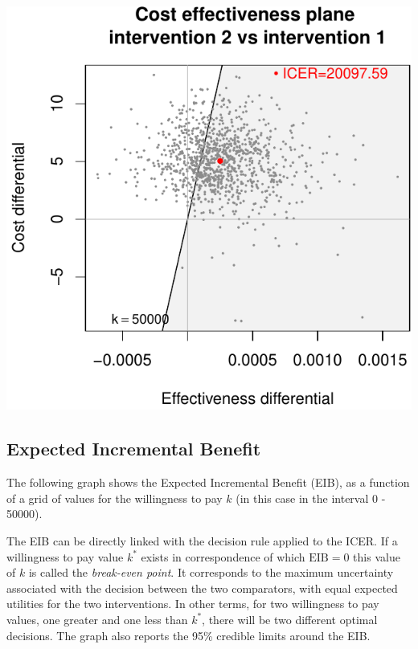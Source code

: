 \documentclass[]{article}
\newenvironment{Shaded}{\begin{snugshade}}{\end{snugshade}}
\newcommand{\ControlFlowTok}[1]{\textcolor[rgb]{0.13,0.29,0.53}{\textbf{#1}}}
\newcommand{\DataTypeTok}[1]{\textcolor[rgb]{0.13,0.29,0.53}{#1}}
\newcommand{\DecValTok}[1]{\textcolor[rgb]{0.00,0.00,0.81}{#1}}
\newcommand{\KeywordTok}[1]{\textcolor[rgb]{0.13,0.29,0.53}{\textbf{#1}}}
\newcommand{\NormalTok}[1]{#1}
\newcommand{\OperatorTok}[1]{\textcolor[rgb]{0.81,0.36,0.00}{\textbf{#1}}}
\newcommand{\OtherTok}[1]{\textcolor[rgb]{0.56,0.35,0.01}{#1}}
\newcommand{\StringTok}[1]{\textcolor[rgb]{0.31,0.60,0.02}{#1}}
\begin{document}
\begin{center}\includegraphics{report_files/figure-latex/unnamed-chunk-3-1} \end{center}

\hypertarget{expected-incremental-benefit}{%
\subsection{Expected Incremental
Benefit}\label{expected-incremental-benefit}}

The following graph shows the Expected Incremental Benefit (EIB), as a
function of a grid of values for the willingness to pay \(k\) (in this
case in the interval 0 - 50000).

The EIB can be directly linked with the decision rule applied to the
ICER. If a willingness to pay value \(k^*\) exists in correspondence of
which \(\mbox{EIB}=0\) this value of \(k\) is called the
\emph{break-even point}. It corresponds to the maximum uncertainty
associated with the decision between the two comparators, with equal
expected utilities for the two interventions. In other terms, for two
willingness to pay values, one greater and one less than \(k^*\), there
will be two different optimal decisions. The graph also reports the 95\%
credible limits around the EIB.

\begin{Shaded}
\end{Shaded}
\end{document}
